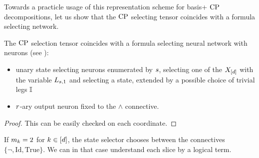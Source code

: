 Towards a practicle usage of this representation scheme for basis+ $\mathrm{CP}$ decompositions, let us show that the $\mathrm{CP}$ selecting tensor coincides with a formula selecting network.

\begin{lemma}
    \label{lem:fsnnRepresentingSliceSelector}
    The $\mathrm{CP}$ selection tensor coincides with a formula selecting neural network with neurons (see ):
    \begin{itemize}
        \item unary state selecting neurons enumerated by $s$, selecting one of the $X_{[d]}$ with the variable $L_{s,1}$ and selecting a state, extended by a possible choice of trivial legs $\mathbb{I}$
        \item $r$-ary output neuron fixed to the $\land$ connective.
    \end{itemize}
\end{lemma}
\begin{proof}
    This can be easily checked on each coordinate.
\end{proof}

If $m_{k}=2$ for $k\in[d]$, the state selector chooses between the connectives $\{\lnot, \mathrm{Id}, \mathrm{True}\}$.
We can in that case understand each slice by a logical term.

